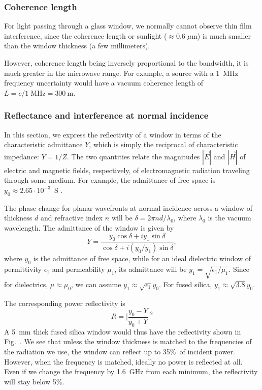 \subsubsection{Coherence length}

For light passing through a glass window, we normally cannot observe thin film
interference, since the coherence length or sunlight ($\approx0.6\;\mu$m) is
much smaller than the window thickness (a few millimeters).

However, coherence length being inversely proportional to the bandwidth, it is
much greater in the microwave range. For example, a source with a 1~MHz frequency
uncertainty would have a vacuum coherence length of
$L=c/1\;\text{MHz}=300~\text{m}$.

\subsubsection{Reflectance and interference at normal incidence}

In this section, we express the reflectivity of a window in terms of the
characteristic admittance $Y$, which is simply the reciprocal of
characteristic impedance: $Y=1/Z$. The two quantities relate the magnitudes
$|\vec E|$ and $|\vec H|$ of electric and magnetic fields, respectively, of
electromagnetic radiation traveling through some medium. For example, the
admittance of free space is $y_0\approx2.65\cdot10^{-3}$~S
\cite[eqn~2.25]{macleod2017thin}.

The phase change for planar wavefronts at normal incidence across a window of
thickness $d$ and refractive index $n$ will be $\delta=2\pi nd/\lambda_0$, where
$\lambda_0$ is the vacuum wavelength. The admittance of the window is given by
\cite[eqn~2.93]{macleod2017thin}
%
\begin{equation}
    \label{win_admittance}
    Y=\frac{y_0\cos\delta+iy_1\sin\delta}{\cos\delta+i(y_0/y_1)\sin\delta},
\end{equation}
%
where $y_0$ is the admittance of free space, while for an ideal dielectric
window of permittivity $\epsilon_1$ and permeability $\mu_1$, its admittance will be $y_1=\sqrt{\epsilon_1/\mu_1}$. Since for
dielectrics, $\mu\approx\mu_0$, we can assume
$y_1\approx\sqrt{\epsilon_1}y_0$. For fused silica,
$y_1\approx\sqrt{3.8}y_0$.

The corresponding power reflectivity is \cite[eqn~2.91]{macleod2017thin}
%
\begin{equation}
    \label{win_refl}
    R=\Big|\frac{y_0-Y}{y_0+Y}\Big|^2
\end{equation}
%
A 5~mm thick fused silica window would thus have the reflectivity shown in
Fig.~. We see that unless the window thickness is matched to the
frequencies of the radiation we use, the window can reflect up to 35\%\ of
incident power. However, when the frequency is matched, ideally no power is
reflected at all. Even if we change the frequency by 1.6~GHz from each minimum,
the reflectivity will stay below 5\%.

